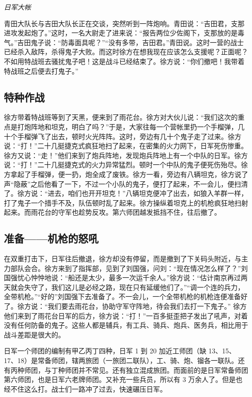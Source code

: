 \documentclass[UTF8,a4paper,titlepage,twoside,10.5pt]{article}
\begin{document}
\emph{日军大帐}

青田大队长与吉田大队长正在交谈，突然听到一阵炮响。青田说：“吉田君，支那进攻发起炮了。”这时，一名大尉走了进来说：“报告两位少佐阁下，支那放的是毒气。”吉田鬼子说：“防毒面具呢？”“没有多带，吉田君。”青田说。这时一营的战士已经杀入敌阵，杀得鬼子大败。而这时徐方在想我现在应该怎么支援呢？正面呢？不如用特战班去骚扰鬼子吧！这是战斗已经结束了。徐方说：“你们撤吧！我带着特战班之后便去打鬼子。”

\subsection{特种作战}
\label{sec:org1fac4f8}

徐方带着特战班等到了天黑，便来到了雨花台。徐方对大伙儿说：“我们这次的重点是打炮阵地和坦克，明白了吗？”于是，大家往每一个营帐里扔一个手榴弹，几十个手榴弹飞了出去，顿时火光阵阵。这时，旁边有几十个鬼子走了过来。徐方说：“打！”二十几挺捷克式疯狂地扫了起来，在密集的火力网下，日军死伤惨重。徐方又说：“走！”他们来到了炮兵阵地，发现炮兵阵地上有一个中队的日军。徐方说：“打！”二十几挺捷克式的火力异常猛烈。顿时一个中队的鬼子便死伤殆尽。徐方拿起了手榴弹，便一扔，炮全成了废铁。徐方一看，旁边有八辆坦克，徐方说了声“隐蔽”之后他看了一下，不过一个小队的鬼子，便打了起来，不一会儿，便扫清了。徐方说：“进去，咱们也开开坦克！”八辆坦克便冲了出去，如狼入羊群一样，打了鬼子一个措手不及，队伍顿时乱了起来。徐方操纵着坦克上的机枪疯狂地扫射起来。而雨花台的守军也趁势反攻。第六师团越发抵挡不住，往后撤了。

\subsection{准备——机枪的怒吼}
\label{sec:orgcf411b9}

在双重打击下，日军往后撤退，徐方却没有停留，而是撤到了下关码头附近，与主力部队会合。徐方来到了指挥部，见到了刘国强，问刘：“现在情况怎么样了？”刘国强忧心忡忡地说：“船还是太少，最多一次运千余人。”徐方说：“估计南京再过两天就会失守了，我们这儿是必经之路，现在只有延缓他们了。”“调一个连的兵力，全带机枪。”“好的”刘国强下去准备了。不一会儿，一个全带机枪的机枪连便准备好了。徐方说：“我们要去雨花台，协助守军守阵地，待会我们去打一下鬼子。” 徐方他们来到了雨花台日军的后方，徐方说：“打！”一百多挺歪把子发出了吼声，对着没有任何防备的鬼子。这些人都是辅兵，有工兵、骑兵、炮兵、医务兵，相比用于战斗差距是很大的。

日军一个师团的编制有甲乙丙丁四种，日军 1 到 20 加近工师团（缺 13、15、17、18）是常备师团，辖两旅团（一旅团二联队），工、骑、炮、镏各一联队。还有丙种师团，与丁种师团并不常见。还有独立混成旅团。而面前的是日军常备师团第六师团，也是日军六老牌师团。又补充一些兵员，所以有 3 万余人了。但是也经不住这么打。战士们一路冲了过去，快速碾压日军。
\end{document}

